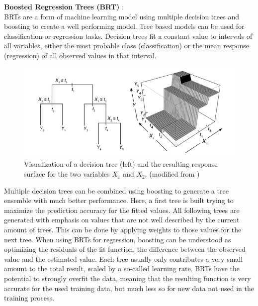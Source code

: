 \documentclass[12pt,a4paper]{article}
\begin{document}
\textbf{Boosted Regression Trees (BRT)} \cite{elith2008brt}:\\
BRTs are a form of machine learning model using multiple decision trees and boosting to create a well performing model.
Tree based models can be used for classification or regression tasks.
Decision trees fit a constant value to intervals of all variables, either the most probable class (classification) or the mean response (regression) of all observed values in that interval.
\begin{figure}[!h]
    \centering
    \includegraphics[width = \linewidth]{figures/elith-brt.png}
    \caption{\label{fig:elith_brt} Visualization of a decision tree (left) and the resulting response surface for the two variables $X_1$ and $X_2$. (modified from \cite{elith2008brt})}
\end{figure}

Multiple decision trees can be combined using boosting to generate a tree ensemble with much better performance.
Here, a first tree is built trying to maximize the prediction accuracy for the fitted values.
All following trees are generated with emphasis on values that are not well described by the current amount of trees.
This can be done by applying weights to those values for the next tree.
When using BRTs for regression, boosting can be understood as optimizing the residuals of the fit function, the difference between the observed value and the estimated value.
Each tree usually only contributes a very small amount to the total result, scaled by a so-called learning rate.
BRTs have the potential to strongly overfit the data, meaning that the resulting function is very accurate for the used training data, but much less so for new data not used in the training process.
\end{document}
